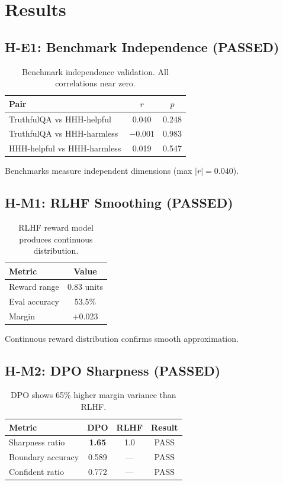 \section{Results}

\subsection{H-E1: Benchmark Independence (PASSED)}

\begin{table}[h]
\centering
\begin{tabular}{lcc}
\toprule
Pair & $r$ & $p$ \\
\midrule
TruthfulQA vs HHH-helpful & 0.040 & 0.248 \\
TruthfulQA vs HHH-harmless & $-0.001$ & 0.983 \\
HHH-helpful vs HHH-harmless & 0.019 & 0.547 \\
\bottomrule
\end{tabular}
\caption{Benchmark independence validation. All correlations near zero.}
\label{tab:independence}
\end{table}

Benchmarks measure independent dimensions (max $|r| = 0.040$).

\subsection{H-M1: RLHF Smoothing (PASSED)}

\begin{table}[h]
\centering
\begin{tabular}{lc}
\toprule
Metric & Value \\
\midrule
Reward range & 0.83 units \\
Eval accuracy & 53.5\% \\
Margin & +0.023 \\
\bottomrule
\end{tabular}
\caption{RLHF reward model produces continuous distribution.}
\label{tab:rlhf}
\end{table}

Continuous reward distribution confirms smooth approximation.

\subsection{H-M2: DPO Sharpness (PASSED)}

\begin{table}[h]
\centering
\begin{tabular}{lccc}
\toprule
Metric & DPO & RLHF & Result \\
\midrule
Sharpness ratio & \textbf{1.65} & 1.0 & PASS \\
Boundary accuracy & 0.589 & --- & PASS \\
Confident ratio & 0.772 & --- & PASS \\
\bottomrule
\end{tabular}
\caption{DPO shows 65\% higher margin variance than RLHF.}
\label{tab:dpo}
\end{table}

